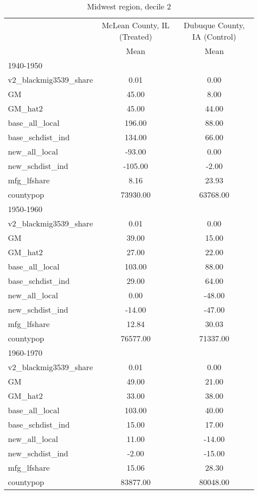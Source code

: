 \begin{table}[htbp]\centering
\def\sym#1{\ifmmode^{#1}\else\(^{#1}\)\fi}
\caption{Midwest region, decile 2 \label{tab1}}
\begin{tabular}{l*{2}{c}}
\toprule
                    &\multicolumn{1}{c}{McLean County, IL (Treated)}&\multicolumn{1}{c}{Dubuque County, IA (Control)}\\
                    &        Mean&        Mean\\
\midrule
1940-1950           &            &            \\
v2\_blackmig3539\_share&        0.01&        0.00\\
GM                  &       45.00&        8.00\\
GM\_hat2             &       45.00&       44.00\\
base\_all\_local      &      196.00&       88.00\\
base\_schdist\_ind    &      134.00&       66.00\\
new\_all\_local       &      -93.00&        0.00\\
new\_schdist\_ind     &     -105.00&       -2.00\\
mfg\_lfshare         &        8.16&       23.93\\
countypop           &    73930.00&    63768.00\\
\midrule
1950-1960           &            &            \\
v2\_blackmig3539\_share&        0.01&        0.00\\
GM                  &       39.00&       15.00\\
GM\_hat2             &       27.00&       22.00\\
base\_all\_local      &      103.00&       88.00\\
base\_schdist\_ind    &       29.00&       64.00\\
new\_all\_local       &        0.00&      -48.00\\
new\_schdist\_ind     &      -14.00&      -47.00\\
mfg\_lfshare         &       12.84&       30.03\\
countypop           &    76577.00&    71337.00\\
\midrule
1960-1970           &            &            \\
v2\_blackmig3539\_share&        0.01&        0.00\\
GM                  &       49.00&       21.00\\
GM\_hat2             &       33.00&       38.00\\
base\_all\_local      &      103.00&       40.00\\
base\_schdist\_ind    &       15.00&       17.00\\
new\_all\_local       &       11.00&      -14.00\\
new\_schdist\_ind     &       -2.00&      -15.00\\
mfg\_lfshare         &       15.06&       28.30\\
countypop           &    83877.00&    80048.00\\
\bottomrule
\end{tabular}
\end{table}
